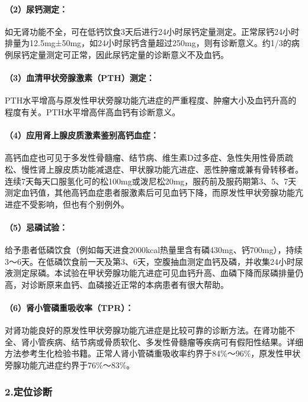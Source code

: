 \paragraph{（2）尿钙测定：}

如无肾功能不全，可在低钙饮食3天后进行24小时尿钙定量测定。正常尿钙24小时排量为12.5mg±50mg，如24小时尿钙含量超过250mg，则有诊断意义。约1/3的病例尿钙定量测定可正常，因此尿钙定量的诊断意义不及血钙。

\paragraph{（3）血清甲状旁腺激素（PTH）测定：}

PTH水平增高与原发性甲状旁腺功能亢进症的严重程度、肿瘤大小及血钙升高的程度有关。PTH水平增高伴高血钙有诊断意义。

\paragraph{（4）应用肾上腺皮质激素鉴别高钙血症：}

高钙血症也可见于多发性骨髓瘤、结节病、维生素D过多症、急性失用性骨质疏松、慢性肾上腺皮质功能减退症、甲状腺功能亢进症、恶性肿瘤或兼有骨转移者。连续7天每天口服氢化可的松100mg或泼尼松20mg，服药前及服药期第3、5、7天测定血钙值，其他高钙血症患者服激素后可见血钙下降，而原发性甲状旁腺功能亢进症不受影响，但也有个别例外。

\paragraph{（5）忌磷试验：}

给予患者低磷饮食（例如每天进食2000kcal热量里含有磷430mg、钙700mg），持续3～6天。在低磷饮食前一天及第3、6天，空腹抽血测定血钙及磷，并收集24小时尿液测定尿磷。本试验在甲状旁腺功能亢进症可见血钙升高、血磷下降而尿磷排量仍高，对诊断原来血钙、血磷接近正常的本病患者有很大帮助。

\paragraph{（6）肾小管磷重吸收率（TPR）：}

对肾功能良好的原发性甲状旁腺功能亢进症是比较可靠的诊断方法。在肾功能不全、肾小管疾病、结节病或骨质软化、多发性骨髓瘤等疾病可有假阳性结果。详细方法参考生化检验书籍。正常人肾小管磷重吸收率约界于84\%～96\%，原发性甲状旁腺功能亢进症约界于76\%～83\%。

\subsubsection{2.定位诊断}

